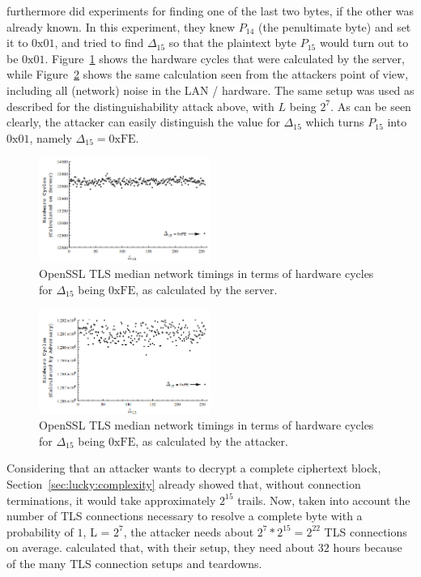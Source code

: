\documentclass[10pt,conference,a4paper]{IEEEtran}
\begin{document}
\citeauthor{alfardan2013lucky} furthermore did experiments for finding one of the last two bytes, if the other was already known. In this experiment, they knew $P_{14}$ (the penultimate byte) and set it to $0\text{x}01$, and tried to find $\Delta_{15}$ so that the plaintext byte $P_{15}$ would turn out to be $0\text{x}01$. Figure~\ref{fig:luckybyteserver} shows the hardware cycles that were calculated by the server, while Figure~\ref{fig:luckybyteattacker} shows the same calculation seen from the attackers point of view, including all (network) noise in the LAN / hardware. The same setup was used as described for the distinguishability attack above, with $L$ being $2^7$. As can be seen clearly, the attacker can easily distinguish the value for $\Delta_{15}$ which turns $P_{15}$ into $0\text{x}01$, namely $\Delta_{15} = 0\text{xFE}$.

\begin{figure}[h]
	\centering
	\includegraphics[width=0.5\textwidth]{lucky_byte_server.png}
	\caption{OpenSSL TLS median network timings in terms of hardware cycles for $\Delta_{15}$ being $0\text{xFE}$, as calculated by the server.~\cite{alfardan2013lucky}}
	\label{fig:luckybyteserver}
\end{figure}

\begin{figure}[h]
	\centering
	\includegraphics[width=0.5\textwidth]{lucky_byte_attacker.png}
	\caption{OpenSSL TLS median network timings in terms of hardware cycles for $\Delta_{15}$ being $0\text{xFE}$, as calculated by the attacker.~\cite{alfardan2013lucky}}
	\label{fig:luckybyteattacker}
\end{figure}

Considering that an attacker wants to decrypt a complete ciphertext block, Section~\ref{sec:lucky:complexity} already showed that, without connection terminations, it would take approximately $2^{15}$ trails. Now, taken into account the number of TLS connections necessary to resolve a complete byte with a probability of $1$, L = $2^7$, the attacker needs about $2^7*2^{15} = 2^{22}$ TLS connections on average. \citeauthor{alfardan2013lucky} calculated that, with their setup, they need about $32$ hours because of the many TLS connection setups and teardowns.
\end{document}
